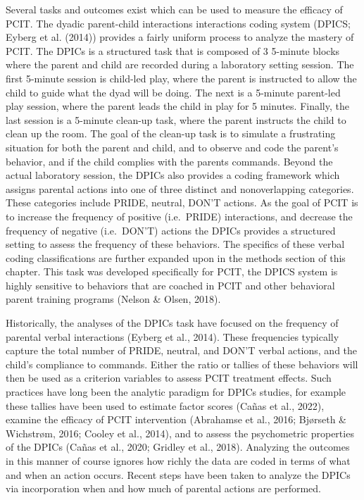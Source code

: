 \documentclass[12pt]{./styles/outhesis}
\begin{document}
Several tasks and outcomes exist which can be used to measure the
efficacy of PCIT. The dyadic parent-child interactions interactions
coding system (DPICS; Eyberg et al. (2014)) provides a fairly uniform
process to analyze the mastery of PCIT. The DPICs is a structured task
that is composed of 3 5-minute blocks where the parent and child are
recorded during a laboratory setting session. The first 5-minute session
is child-led play, where the parent is instructed to allow the child to
guide what the dyad will be doing. The next is a 5-minute parent-led
play session, where the parent leads the child in play for 5
minutes. Finally, the last session is a 5-minute clean-up task, where
the parent instructs the child to clean up the room. The goal of the
clean-up task is to simulate a frustrating situation for both the parent
and child, and to observe and code the parent's behavior, and if the
child complies with the parents commands. Beyond the actual laboratory
session, the DPICs also provides a coding framework which assigns
parental actions into one of three distinct and nonoverlapping
categories. These categories include PRIDE, neutral, DON'T actions. As
the goal of PCIT is to increase the frequency of positive (i.e.~PRIDE)
interactions, and decrease the frequency of negative (i.e.~DON'T)
actions the DPICs provides a structured setting to assess the frequency
of these behaviors. The specifics of these verbal coding classifications are further
expanded upon in the methods section of this chapter. This task was
developed specifically for PCIT, the DPICS system is highly sensitive to
behaviors that are coached in PCIT and other behavioral parent training
programs (Nelson \& Olsen, 2018).

Historically, the analyses of the DPICs task have focused on the
frequency of parental verbal interactions (Eyberg et al., 2014). These
frequencies typically capture the total number of PRIDE, neutral, and
DON'T verbal actions, and the child's compliance to commands. Either the
ratio or tallies of these behaviors will then be used as a criterion
variables to assess PCIT treatment effects. Such practices have long
been the analytic paradigm for DPICs studies, for example these tallies
have been used to estimate factor scores (Cañas et al., 2022), examine
the efficacy of PCIT intervention (Abrahamse et al., 2016; Bjørseth \&
Wichstrøm, 2016; Cooley et al., 2014), and to assess the psychometric
properties of the DPICs (Cañas et al., 2020; Gridley et al., 2018).
Analyzing the outcomes in this manner of course ignores how richly the
data are coded in terms of what and when an action occurs. Recent steps
have been taken to analyze the DPICs via incorporation when and how much
of parental actions are performed.
\end{document}
